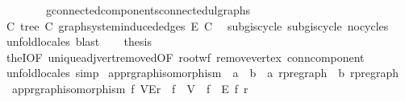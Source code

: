 \begin{isabellebody}
\ \ \ \ \ \ \ \ g{\isacharprime}{\kern0pt}{\isachardot}{\kern0pt}connected{\isacharunderscore}{\kern0pt}components{\isacharunderscore}{\kern0pt}connected{\isacharunderscore}{\kern0pt}ulgraphs{\isacharparenright}{\kern0pt}\isanewline
\ \ \isamarkupfalse%
\ C{\isacharcolon}{\kern0pt}\ tree\ C\ {\isachardoublequoteopen}graph{\isacharunderscore}{\kern0pt}system{\isachardot}{\kern0pt}induced{\isacharunderscore}{\kern0pt}edges\ E{\isacharprime}{\kern0pt}\ C{\isachardoublequoteclose}\ \isamarkupfalse%
\ subg{\isachardot}{\kern0pt}is{\isacharunderscore}{\kern0pt}cycle{}\ subg{\isacharprime}{\kern0pt}{\isachardot}{\kern0pt}is{\isacharunderscore}{\kern0pt}cycle{}\ no{\isacharunderscore}{\kern0pt}cycles\ \isamarkupfalse%
\ {\isacharparenleft}{\kern0pt}unfold{\isacharunderscore}{\kern0pt}locales{\isacharcomma}{\kern0pt}\ blast{\isacharparenright}{\kern0pt}\isanewline
\ \ \isamarkupfalse%
\ {\isacharquery}{\kern0pt}thesis\ \isamarkupfalse%
\ theI{\isacharprime}{\kern0pt}{\isacharbrackleft}{\kern0pt}OF\ unique{\isacharunderscore}{\kern0pt}adj{\isacharunderscore}{\kern0pt}vert{\isacharunderscore}{\kern0pt}removed{\isacharbrackleft}{\kern0pt}OF\ root{\isacharunderscore}{\kern0pt}wf\ remove{\isacharunderscore}{\kern0pt}vertex\ conn{\isacharunderscore}{\kern0pt}component{\isacharbrackright}{\kern0pt}{\isacharbrackright}{\kern0pt}\ \isamarkupfalse%
\ unfold{\isacharunderscore}{\kern0pt}locales\ simp\isanewline
{}\isamarkupfalse%
%
\endisatagproof
{\isafoldproof}%
%
\isadelimproof
\isanewline
%
\endisadelimproof
\isanewline
{}\isamarkupfalse%
\isanewline
\isanewline
{}\isamarkupfalse%
\ app{\isacharunderscore}{\kern0pt}rgraph{\isacharunderscore}{\kern0pt}isomorphism\ {\isacharcolon}{\kern0pt}{\isacharcolon}{\kern0pt}\ {\isachardoublequoteopen}{\isacharparenleft}{\kern0pt}{\isacharprime}{\kern0pt}a\ {\isasymRightarrow}\ {\isacharprime}{\kern0pt}b{\isacharparenright}{\kern0pt}\ {\isasymRightarrow}\ {\isacharprime}{\kern0pt}a\ rpregraph\ {\isasymRightarrow}\ {\isacharprime}{\kern0pt}b\ rpregraph{\isachardoublequoteclose}\ \isanewline
\ \ {\isachardoublequoteopen}app{\isacharunderscore}{\kern0pt}rgraph{\isacharunderscore}{\kern0pt}isomorphism\ f\ {\isacharparenleft}{\kern0pt}V{\isacharcomma}{\kern0pt}E{\isacharcomma}{\kern0pt}r{\isacharparenright}{\kern0pt}\ {\isacharequal}{\kern0pt}\ {\isacharparenleft}{\kern0pt}f\ {\isacharbackquote}{\kern0pt}\ V{\isacharcomma}{\kern0pt}\ {\isacharparenleft}{\kern0pt}{\isacharparenleft}{\kern0pt}{\isacharbackquote}{\kern0pt}{\isacharparenright}{\kern0pt}\ f{\isacharparenright}{\kern0pt}\ {\isacharbackquote}{\kern0pt}\ E{\isacharcomma}{\kern0pt}\ f\ r{\isacharparenright}{\kern0pt}{\isachardoublequoteclose}\isanewline

\end{isabellebody}
